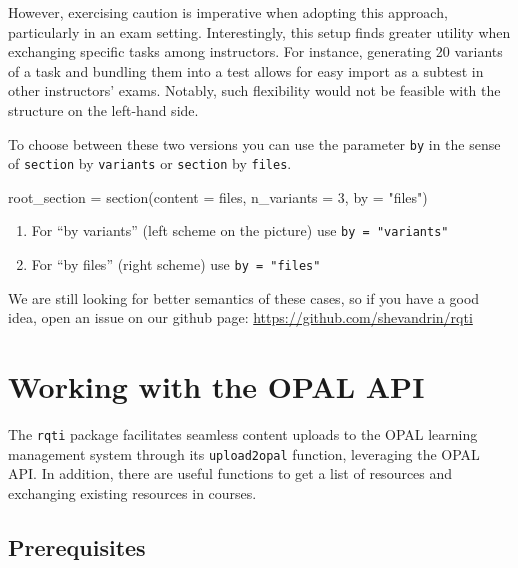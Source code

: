 \documentclass[twoside]{tufte-book}
\newenvironment{Shaded}{}{}
\newcommand{\AttributeTok}[1]{\textcolor[rgb]{0.49,0.56,0.16}{#1}}
\newcommand{\DecValTok}[1]{\textcolor[rgb]{0.25,0.63,0.44}{#1}}
\newcommand{\FunctionTok}[1]{\textcolor[rgb]{0.02,0.16,0.49}{#1}}
\newcommand{\NormalTok}[1]{#1}
\newcommand{\OtherTok}[1]{\textcolor[rgb]{0.00,0.44,0.13}{#1}}
\newcommand{\StringTok}[1]{\textcolor[rgb]{0.25,0.44,0.63}{#1}}
\providecommand{\tightlist}{%
  \setlength{\itemsep}{0pt}\setlength{\parskip}{0pt}}
\begin{document}
However, exercising caution is imperative when adopting this approach, particularly in an exam setting. Interestingly, this setup finds greater utility when exchanging specific tasks among instructors. For instance, generating 20 variants of a task and bundling them into a test allows for easy import as a subtest in other instructors' exams. Notably, such flexibility would not be feasible with the structure on the left-hand side.

To choose between these two versions you can use the parameter \texttt{by} in the sense of \texttt{section} by \texttt{variants} or \texttt{section} by \texttt{files}.

\begin{Shaded}
\begin{Highlighting}[]
\NormalTok{root\_section }\OtherTok{=} \FunctionTok{section}\NormalTok{(}\AttributeTok{content =}\NormalTok{ files, }\AttributeTok{n\_variants =} \DecValTok{3}\NormalTok{, }\AttributeTok{by =} \StringTok{"files"}\NormalTok{)}
\end{Highlighting}
\end{Shaded}

\begin{enumerate}
\def\labelenumi{\arabic{enumi}.}
\tightlist
\item
  For ``by variants'' (left scheme on the picture) use \texttt{by\ =\ "variants"}
\item
  For ``by files'' (right scheme) use \texttt{by\ =\ "files"}
\end{enumerate}

We are still looking for better semantics of these cases, so if you have a good idea, open an issue on our github page: \url{https://github.com/shevandrin/rqti}

\chapter{Working with the OPAL API}\label{working-with-the-opal-api}

The \texttt{rqti} package facilitates seamless content uploads to the OPAL learning management system through its \texttt{upload2opal} function, leveraging the OPAL API. In addition, there are useful functions to get a list of resources and exchanging existing resources in courses.

\section{Prerequisites}\label{prerequisites}
\end{document}
